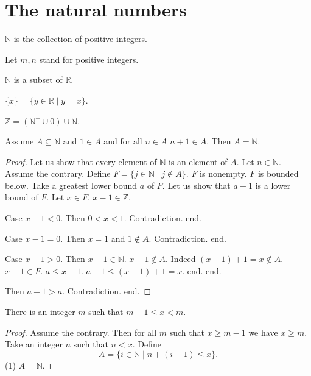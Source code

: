 \documentclass{article}
\begin{document}
\section{The natural numbers}
\begin{forthel}

\begin{definition} $\mathbb{N}$ is the collection 
of positive integers.
\end{definition}
Let $m,n$ stand for positive integers.

\begin{lemma} $\mathbb{N}$ is a subset of $\mathbb{R}$.
\end{lemma}

\begin{definition} $\{x\} = \{y \in \mathbb{R} \mid y = x\}$.
\end{definition}

\begin{lemma} $\mathbb{Z} = (\mathbb{N}^- \cup {0}) \cup \mathbb{N}$.
\end{lemma}

\begin{theorem} Assume $A \subseteq \mathbb{N}$ 
and $1 \in A$ and for all $n \in A$ $n + 1 \in A$.
Then $A = \mathbb{N}$.\end{theorem}

\begin{proof}
Let us show that every element of $\mathbb{N}$ is an element of $A$. 
	Let $n \in \mathbb{N}$.
	Assume the contrary.
	Define $F = \{  j \in \mathbb{N} \mid j \notin A\}$.
	$F$ is nonempty. $F$ is bounded below.
  Take a greatest lower bound $a$ of $F$.
	Let us show that $a+1$ is a lower bound of $F$.
		Let $x \in F$. $x - 1 \in \mathbb{Z}$.
		
		Case $x - 1 < 0$. Then $0 < x < 1$. Contradiction. end.

		Case $x - 1 = 0$. Then $x = 1$ and $1 \notin A$. Contradiction. end.
		
		Case $x - 1 > 0$. Then $x - 1 \in \mathbb{N}$. 
      $x - 1 \notin A$. Indeed $(x - 1) + 1 = x \notin A$. $x - 1 \in F$.
			$a \leq x - 1$.
			$a + 1 \leq (x - 1) + 1 = x$.
			end.
	end.
	
	Then $a+1 > a$.
	Contradiction.
end.
\end{proof}

\begin{lemma}
There is an integer $m$ such that
$m -1 \leq x < m$.
\end{lemma}
\begin{proof}
Assume the contrary.
Then for all $m$ such that $x \geq m-1 $ we have $x \geq m$.
Take an integer $n$ such that $n < x$.
Define 
$$A = \{i \in \mathbb{N} \mid n + (i - 1) \leq x\}.$$
(1) $A = \mathbb{N}$.


\end{proof}
\end{forthel}
\end{document}
